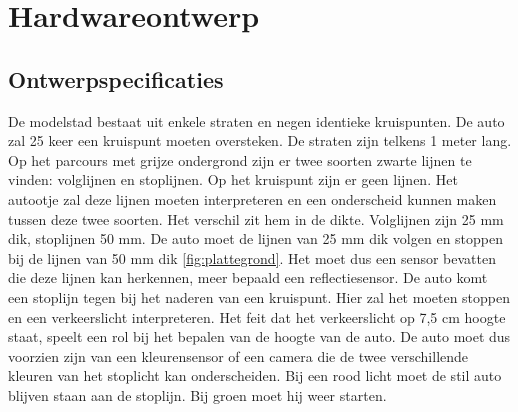 \documentclass[a4paper,twoside,kulak]{kulakreport} %
\begin{document}
\section{Hardwareontwerp} \label{Hardwareontwerp}

\subsection{Ontwerpspecificaties} \label{Ontwerpspecificaties}


De modelstad bestaat uit enkele straten en negen identieke kruispunten. De auto zal 25 keer een kruispunt moeten oversteken. De straten zijn telkens 1 meter lang. Op het parcours met grijze ondergrond zijn er twee soorten zwarte lijnen te vinden: volglijnen en stoplijnen. Op het kruispunt  zijn er geen lijnen. Het autootje zal deze lijnen moeten interpreteren en een onderscheid kunnen maken tussen deze twee soorten. Het verschil zit hem in de dikte. Volglijnen zijn 25 mm dik, stoplijnen 50 mm. De auto moet de lijnen van 25 mm dik volgen en stoppen bij de lijnen van 50 mm dik \ref{fig:plattegrond}. Het moet dus een sensor bevatten die deze lijnen kan herkennen, meer bepaald een reflectiesensor. De auto komt een stoplijn tegen bij het naderen van een kruispunt. Hier zal het moeten stoppen en een verkeerslicht interpreteren. Het feit dat het verkeerslicht op 7,5 cm hoogte staat, speelt een rol bij het bepalen van de hoogte van de auto. De auto moet dus voorzien zijn van een kleurensensor of een camera die de twee verschillende kleuren van het stoplicht kan onderscheiden. Bij een rood licht moet de stil auto blijven staan aan de stoplijn. Bij groen moet hij weer starten. 
\end{document}
